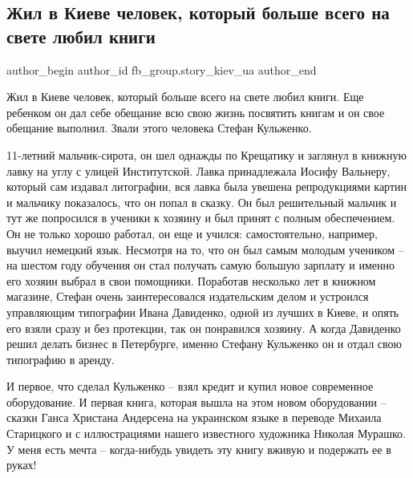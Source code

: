  
 
 
 
 
 
\subsection{Жил в Киеве человек, который больше всего на свете любил книги}
\label{sec:01_02_2022.fb.fb_group.story_kiev_ua.1.chelovek_kiev_knigi}
 
\ifcmt
 author_begin
   author_id fb_group.story_kiev_ua
 author_end
\fi

Жил в Киеве человек, который больше всего на свете любил книги. Еще ребенком он
дал себе обещание всю свою жизнь посвятить книгам и он свое обещание выполнил.
Звали этого человека Стефан Кульженко.

11-летний мальчик-сирота, он шел однажды по Крещатику и заглянул в книжную
лавку на углу с улицей Институтской. Лавка принадлежала Иосифу Вальнеру,
который сам издавал литографии, вся лавка была увешена репродукциями картин и
мальчику показалось, что он попал в сказку. Он был решительный мальчик и тут же
попросился в ученики к хозяину и был принят с полным обеспечением. Он не только
хорошо работал, он еще и учился: самостоятельно, например, выучил немецкий
язык. Несмотря на то, что он был самым молодым учеником – на шестом году
обучения он стал получать самую большую зарплату и именно его хозяин выбрал в
свои помощники. Поработав несколько лет в книжном магазине, Стефан очень
заинтересовался издательским делом и устроился управляющим типографии Ивана
Давиденко, одной из лучших в Киеве, и опять его взяли сразу и без протекции,
так он понравился хозяину. А когда Давиденко решил делать бизнес в Петербурге,
именно Стефану Кульженко он и отдал свою типографию в аренду.

И первое, что сделал Кульженко – взял кредит и купил новое современное
оборудование. И первая книга, которая вышла на этом новом оборудовании – сказки
Ганса Христана Андерсена на украинском языке в переводе Михаила Старицкого и с
иллюстрациями нашего известного художника Николая Мурашко. У меня есть мечта –
когда-нибудь увидеть эту книгу вживую и подержать ее в руках!

